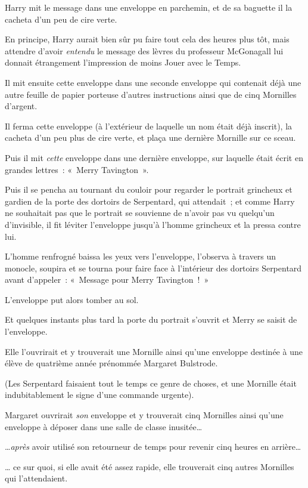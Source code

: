 Harry mit le message dans une enveloppe en parchemin, et de sa baguette il la cacheta d'un peu de cire verte.

En principe, Harry aurait bien sûr pu faire tout cela des heures plus tôt, mais attendre d'avoir \emph{entendu} le message des lèvres du professeur McGonagall lui donnait étrangement l'impression de moins Jouer avec le Temps.

Il mit ensuite cette enveloppe dans une seconde enveloppe qui contenait déjà une autre feuille de papier porteuse d'autres instructions ainsi que de cinq Mornilles d'argent.

Il ferma cette enveloppe (à l'extérieur de laquelle un nom était déjà inscrit), la cacheta d'un peu plus de cire verte, et plaça une dernière Mornille sur ce sceau.

Puis il mit \emph{cette} enveloppe dans une dernière enveloppe, sur laquelle était écrit en grandes lettres~: «~Merry Tavington~».

Puis il se pencha au tournant du couloir pour regarder le portrait grincheux et gardien de la porte des dortoirs de Serpentard, qui attendait~; et comme Harry ne souhaitait pas que le portrait se souvienne de n'avoir pas vu quelqu'un d'invisible, il fit léviter l'enveloppe jusqu'à l'homme grincheux et la pressa contre lui.

L'homme renfrogné baissa les yeux vers l'enveloppe, l'observa à travers un monocle, soupira et se tourna pour faire face à l'intérieur des dortoirs Serpentard avant d'appeler~: «~Message pour Merry Tavington~!~»

L'enveloppe put alors tomber au sol.

Et quelques instants plus tard la porte du portrait s'ouvrit et Merry se saisit de l'enveloppe.

Elle l'ouvrirait et y trouverait une Mornille ainsi qu'une enveloppe destinée à une élève de quatrième année prénommée Margaret Bulstrode.

(Les Serpentard faisaient tout le temps ce genre de choses, et une Mornille était indubitablement le signe d'une commande urgente).

Margaret ouvrirait \emph{son} enveloppe et y trouverait cinq Mornilles ainsi qu'une enveloppe à déposer dans une salle de classe inusitée…

…\emph{après} avoir utilisé son retourneur de temps pour revenir cinq heures en arrière…

… ce sur quoi, si elle avait été assez rapide, elle trouverait cinq autres Mornilles qui l'attendaient.


